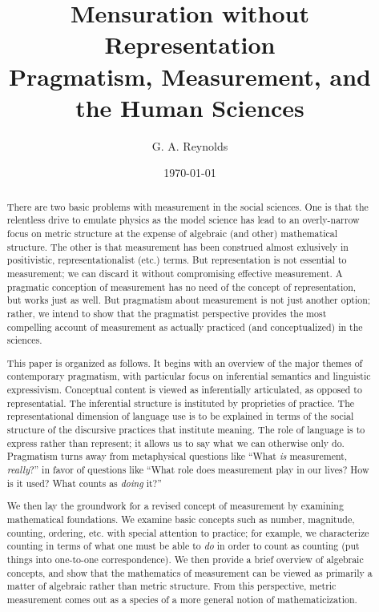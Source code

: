 \documentclass[11pt,twoside]{article}
\title{Mensuration without Representation \\
\vspace{12pt}
\Large Pragmatism, Measurement, and the Human Sciences}
\author{G. A. Reynolds}
\date{\today}
\begin{document}
\maketitle
\nocite{*}

\begin{abstract}

  There are two basic problems with measurement in the social
  sciences.  One is that the relentless drive to emulate physics as
  the model science has lead to an overly-narrow focus on metric
  structure at the expense of algebraic (and other) mathematical
  structure.  The other is that measurement has been construed almost
  exlusively in positivistic, representationalist (etc.) terms.  But
  representation is not essential to measurement; we can discard it
  without compromising effective measurement.  A pragmatic conception
  of measurement has no need of the concept of representation, but
  works just as well.  But pragmatism about measurement is not just
  another option; rather, we intend to show that the pragmatist
  perspective provides the most compelling account of measurement as
  actually practiced (and conceptualized) in the sciences.

  This paper is organized as follows.  It begins with an overview of
  the major themes of contemporary pragmatism, with particular focus
  on inferential semantics and linguistic expressivism.  Conceptual
  content is viewed as inferentially articulated, as opposed to
  representatial.  The inferential structure is instituted by
  proprieties of practice.  The representational dimension of language
  use is to be explained in terms of the social structure of the
  discursive practices that institute meaning.  The role of language
  is to express rather than represent; it allows us to say what we can
  otherwise only do.  Pragmatism turns away from metaphysical
  questions like ``What \textit{is} measurement, \textit{really}?'' in
  favor of questions like ``What role does measurement play in our
  lives?  How is it used?  What counts as \textit{doing} it?''

We then lay the groundwork for a revised concept of measurement by
examining mathematical foundations.  We examine basic concepts such as
number, magnitude, counting, ordering, etc. with special attention to
practice; for example, we characterize counting in terms of what one
must be able to \textit{do} in order to count as counting (put things
into one-to-one correspondence).  We then provide a brief overview of
algebraic concepts, and show that the mathematics of measurement can
be viewed as primarily a matter of algebraic rather than metric
structure.  From this perspective, metric measurement comes out as a
species of a more general notion of mathematicization.


\end{abstract}
\end{document}
